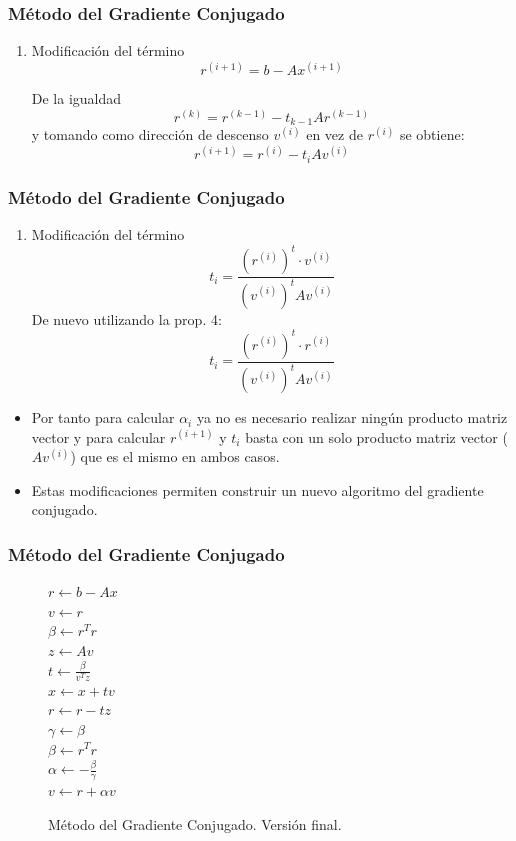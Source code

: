 \documentclass[10pt]{beamer}
\begin{document}
\begin{frame}
  \frametitle{M\'etodo del Gradiente Conjugado}
  \begin{enumerate}
    \item Modificaci\'on del t\'ermino
    $$
     r^{(i+1)} = b -Ax^{(i+1)}
    $$
    
    De la igualdad 
    $$
    r^{(k)} = r^{(k-1)} -t_{k-1}Ar^{(k-1)} 
    $$
    y tomando como direcci\'on de descenso $v^{(i)}$ en vez de $r^{(i)}$ se obtiene:    
    $$
     r^{(i+1)} = r^{(i)} - t_iAv^{(i)}
    $$
  \end{enumerate}
\end{frame}
\begin{frame}
  \frametitle{M\'etodo del Gradiente Conjugado}
  \begin{enumerate}
    \item Modificaci\'on del t\'ermino
    $$
     t_i = \displaystyle\frac{(r^{(i)})^t\cdot v^{(i)}}{(v^{(i)})^tAv^{(i)}}
    $$
    De nuevo utilizando la prop. 4:
    $$
    t_i = \displaystyle\frac{(r^{(i)})^t\cdot r^{(i)}}{(v^{(i)})^tAv^{(i)}}
    $$
  \end{enumerate}
  \begin{itemize}
    \item<2-> Por tanto para calcular $\alpha_i$ ya no es necesario realizar ning\'un producto matriz vector y para calcular $r^{(i+1)}$ y $t_i$ basta con un solo producto matriz vector ($Av^{(i)}$) que es el mismo en ambos casos.
    \item<3-> Estas modificaciones permiten construir un nuevo algoritmo
    del gradiente conjugado.
  \end{itemize}
\end{frame}
\begin{frame}
  \frametitle{M\'etodo del Gradiente Conjugado}
  \begin{figure}[h]    
    \begin{algorithm}[H]     
     \caption{M\'etodo del Gradiente Conjugado. Versi\'on final.}
    $r \leftarrow b -Ax$\\
    $v \leftarrow r$\\
    $\beta \leftarrow r^Tr$\\
     {
    $z\leftarrow Av$\\
    $t\leftarrow \displaystyle\frac{\beta}{v^Tz}$\\
    $x\leftarrow x+tv$\\
    $r\leftarrow r-tz$\\
    $\gamma \leftarrow \beta$\\
    $\beta \leftarrow r^Tr$\\
    $\alpha \leftarrow \displaystyle-\frac{\beta}{\gamma}$\\
    $v\leftarrow r+\alpha v$\\
    }
    \end{algorithm}
    \end{figure}
\end{frame}
\end{document}
